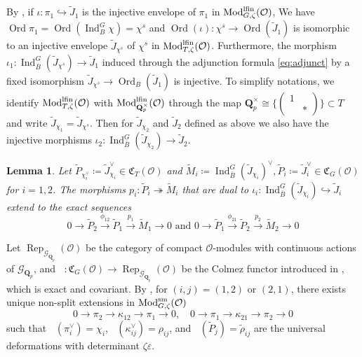 \documentclass[leqno]{amsart}
\newcommand{\smat}[1]{\left( \begin{smallmatrix} #1 \end{smallmatrix} \right)}
\newcommand{\lfMod}{\textnormal{Mod}^{\textnormal{lfin}}}
\DeclareMathOperator{\Mod}{\textnormal{Mod}}
\DeclareMathOperator{\Rep}{Rep}
\newcommand{\fC}{\mathfrak C}
\DeclareMathOperator{\V}{\check{\mathbf{V}}} %
\newcommand{\Gp}{\mathcal{G}_{\Qp}} %
\DeclareMathOperator{\Ord}{Ord}
\newcommand{\sm}{\textnormal{sm}}
\newcommand{\Qp}{\mathbf{Q}_p}
\newcommand{\oo}{\mathcal{O}} %
\DeclareMathOperator{\Ind}{Ind}
\newtheorem{lem}[thm]{Lemma}
\theoremstyle{definition}
\theoremstyle{remark}
\begin{document}
By \cite[Prop 7.1]{pask},
if $\iota\colon \pi_1\hookrightarrow \tilde{J}_1$
is the injective envelope of $\pi_1$
in $\lfMod_{G,\zeta}(\oo)$,
We have $\Ord\pi_1=\Ord(\Ind_B^G\chi)=\chi^s$
and $\Ord(\iota)\colon \chi^s \to \Ord(\tilde{J}_1)$
is isomorphic to an injective envelope
$\tilde{J}_{\chi^s}$ of $\chi^s$
in $\lfMod_{T,\zeta}(\oo)$.
Furthermore, the morphism 
$\iota_1\colon \Ind_{\bar{B}}^G(\tilde{J}_{\chi^s})\to
\tilde{J}_1$
induced through the adjunction formula \eqref{eq:adjunct}
by a fixed isomorphism
$\tilde{J}_{\chi^s}\to \Ord_B(\tilde{J}_1)$
is injective.
To simplify notations,
we identify $\lfMod_{T,\zeta}(\oo)$
with $\lfMod_{\Qp^\times}(\oo)$ through 
the map $\Qp^\times\cong \{\smat{1&\\&*}\}\subset T$
and write $\tilde{J}_{\chi_1}=\tilde{J}_{\chi^s}$.
Then for $ \tilde{J}_{\chi_2}$
and $ \tilde{J}_2$ defined as above
we also have the injective morphisms
$\iota_2\colon \Ind_{\bar{B}}^G(\tilde{J}_{\chi_2})\to
\tilde{J}_2$.


\begin{lem}\cite[Cor 7.7]{pask}
Let $\tilde{P}_{\chi_i^\vee}\coloneqq \tilde{J}_{\chi_i}^\vee
\in\fC_T(\oo)$ and
$\tilde{M}_i\coloneqq 
\Ind_{\bar{B}}^G(\tilde{J}_{\chi_i})^\vee,
\tilde{P}_i\coloneqq \tilde{J}_i^\vee\in\fC_G(\oo)$
for $i=1,2$.
The morphisms
$p_i\colon \tilde{P}_i\twoheadrightarrow \tilde{M}_i$
that are dual to
$\iota_i\colon 
\Ind_{\bar{B}}^G(\tilde{J}_{\chi_i})\hookrightarrow 
\tilde{J}_i$ 
extend to the exact sequences
\begin{equation}\label{eq:exact_PPM}
	0\to \tilde{P}_{2}\xrightarrow{\phi_{12}} 
	\tilde{P}_{1}\xrightarrow{p_1} \tilde{M}_1\to 0 
	\text{ and }
	0\to \tilde{P}_{1}\xrightarrow{\phi_{21}} 
	\tilde{P}_{2}\xrightarrow{p_2} \tilde{M}_2\to 0
\end{equation}
\end{lem}

Let $\Rep_{\Gp}(\oo)$
be the category of compact $\oo$-modules with
continuous actions of $\Gp$,
and $\V\colon \fC_G(\oo)\to \Rep_{\Gp}(\oo)$
be the Colmez functor introduced 
in \cite[\S 5.7]{pask},
which is exact and covariant.
By \cite[Cor 8.7]{pask},
for $(i,j)=(1,2)$ or  $(2,1)$,
there exists unique non-split extensions
in $\Mod^{\sm}_{G,\zeta}(\oo)$ 
\[
	0\to \pi_2\to \kappa_{12}\to \pi_1\to 0,\quad
	0\to \pi_1\to \kappa_{21}\to \pi_2\to 0
\]
such that
$\V(\pi_i^\vee)=\chi_i$, $\V(\kappa_{ij}^\vee)=\rho_{ij}$,
and $\V(\tilde{P}_j)=\tilde{\rho}_{ij}$
are the universal deformations
with determinant $\zeta\varepsilon$.
\end{document}
